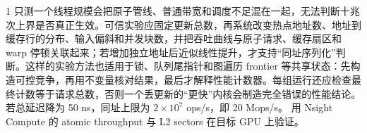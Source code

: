 \begin{solutionexercise}{1}
只测一个线程规模会把原子管线、普通带宽和调度不足混在一起，无法判断十兆次上界是否真正生效。可信实验应固定更新总数，再系统改变热点地址数、地址到缓存行的分布、输入偏斜和并发块数，并把吞吐曲线与原子请求、缓存扇区和 warp 停顿关联起来；若增加独立地址后近似线性提升，才支持“同址序列化”判断。这样的实验方法也适用于锁、队列尾指针和图遍历 frontier 等共享状态：先构造可控竞争，再用不变量核对结果，最后才解释性能计数器。每组运行还应检查最终计数等于请求总数，否则一个丢更新的“更快”内核会制造完全错误的性能结论。
\variantheading 若总延迟降为 50 ns，同址上限为 $2\times10^7$ ops/s，即 20 Mops/s。
\practiceheading 用 Nsight Compute 的 atomic throughput 与 L2 sectors 在目标 GPU 上验证。
\end{solutionexercise}

